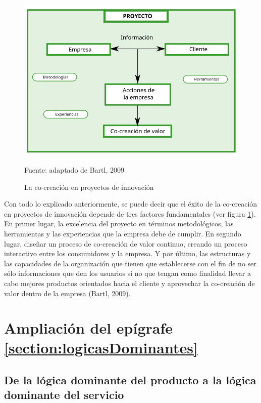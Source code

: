 \begin{figure}[!h]
	\caption{La co-creación en proyectos de innovación}
	\centering \includegraphics[width=140mm]{capitulos/graficos/proyectoInnovacionBartl}
	\label{fig:proyectoInnovacionBartl}

		\footnotesize
		Fuente: adaptado de Bartl, 2009
\end{figure}

Con todo lo explicado anteriormente, se puede decir que el éxito de la co-creación en proyectos de innovación depende de tres factores fundamentales (ver figura \ref{fig:proyectoInnovacionBartl}). En primer lugar, la excelencia del proyecto en términos metodológicos, las herramientas y las experiencias que la empresa debe de cumplir. En segundo lugar, diseñar un proceso de co-creación de valor continuo, creando un proceso interactivo entre los consumidores y la empresa. Y por último, las estructuras y las capacidades de la organización que tienen que establecerse con el fin de no ser sólo informaciones que den los usuarios si no que tengan como finalidad llevar a cabo mejores productos orientados hacia el cliente y aprovechar la co-creación de valor dentro de la empresa (Bartl, 2009).


\chapter{Ampliación del epígrafe \ref{section:logicasDominantes}}
\label{anexo:4}

\section{De la lógica dominante del producto a la lógica dominante del servicio}

